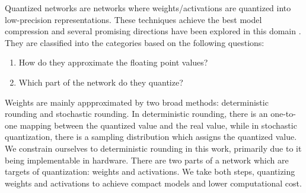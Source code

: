 \noindent Quantized networks are networks where weights/activations are quantized into low-precision representations. These techniques achieve the best model compression and several promising directions have been explored in this domain  \cite{han2015deep}. They are classified into the categories based on the following questions:
\begin{enumerate}
\item How do they approximate the floating point values? 
\item Which part of the network do they quantize?
\end{enumerate}  

\noindent Weights are mainly appproximated by two broad methods: deterministic rounding and stochastic rounding. In deterministic rounding, there is an one-to-one mapping between the quantized value and the real value, while in stochastic quantization, there is a sampling distribution which assigns the quantized value. We constrain ourselves to deterministic rounding in this work, primarily due to it being implementable in hardware. There are two parts of a network which are targets of quantization: weights and activations. We take both steps, quantizing weights and activations to achieve compact models and lower computational cost.\\

